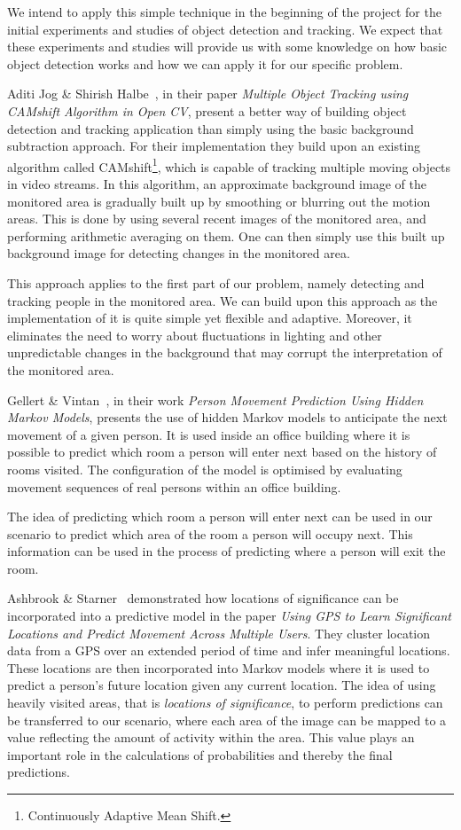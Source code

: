 We intend to apply this simple technique in the beginning of the project for the initial experiments and studies of object detection and tracking. We expect that these experiments and studies will provide us with some knowledge on how basic object detection works and how we can apply it for our specific problem.

Aditi Jog \& Shirish Halbe~\cite{jog_halbe}, in their paper \emph{Multiple Object Tracking using CAMshift Algorithm in Open CV}, present a better way of building object detection and tracking application than simply using the basic background subtraction approach. For their implementation they build upon an existing algorithm called CAMshift\footnote{Continuously Adaptive Mean Shift.}, which is capable of tracking multiple moving objects in video streams. In this algorithm, an approximate background image of the monitored area is gradually built up by smoothing or blurring out the motion areas. This is done by using several recent images of the monitored area, and performing arithmetic averaging on them. One can then simply use this built up background image for detecting changes in the monitored area.

This approach applies to the first part of our problem, namely detecting and tracking people in the monitored area. We can build upon this approach as the implementation of it is quite simple yet flexible and adaptive. Moreover, it eliminates the need to worry about fluctuations in lighting and other unpredictable changes in the background that may corrupt the interpretation of the monitored area.

Gellert \& Vintan~\cite{gellert}, in their work \emph{Person Movement Prediction Using Hidden Markov Models}, presents the use of hidden Markov models to anticipate the next movement of a given person. It is used inside an office building where it is possible to predict which room a person will enter next based on the history of rooms visited. The configuration of the model is optimised by evaluating movement sequences of real persons within an office building.

The idea of predicting which room a person will enter next can be used in our scenario to predict which area of the room a person will occupy next. This information can be used in the process of predicting where a person will exit the room.

Ashbrook \& Starner~\cite{ashbrook} demonstrated how locations of significance can be incorporated into a predictive model in the paper \emph{Using GPS to Learn Significant Locations and Predict Movement Across Multiple Users}. They cluster location data from a GPS over an extended period of time and infer meaningful locations. These locations are then incorporated into Markov models where it is used to predict a person's future location given any current location. The idea of using heavily visited areas, that is \emph{locations of significance}, to perform predictions can be transferred to our scenario, where each area of the image can be mapped to a value reflecting the amount of activity within the area. This value plays an important role in the calculations of probabilities and thereby the final predictions.


